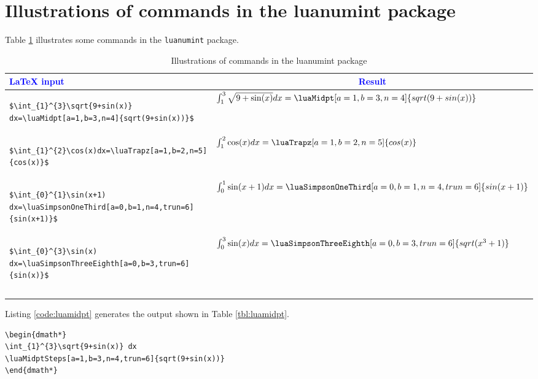 \documentclass{article}
\begin{document}
\section{Illustrations of commands in the luanumint package}
Table \ref{tbl:illluanumint} illustrates some commands in the \verb|luanumint| package.
\begin{center}
\begin{longtable}{m{10.8cm}l}
\toprule
\multicolumn{1}{l}{\textcolor{blue}{LaTeX input}} & \multicolumn{1}{c}{\textcolor{blue}{Result}}  \\
\toprule
\begin{lstlisting}[caption={[]}]
$\int_{1}^{3}\sqrt{9+sin(x)} dx=\luaMidpt[a=1,b=3,n=4]{sqrt(9+sin(x))}$
\end{lstlisting} & $\int_{1}^{3}\sqrt{9+\sin(x)} dx=\luaMidpt[a=1,b=3,n=4]{sqrt(9+sin(x))}$ \\  \midrule
\begin{lstlisting}[caption={[]}]
$\int_{1}^{2}\cos(x)dx=\luaTrapz[a=1,b=2,n=5]{cos(x)}$
\end{lstlisting} & $\int_{1}^{2}\cos(x) dx=\luaTrapz[a=1,b=2,n=5]{cos(x)}$ \\ \midrule
\begin{lstlisting}[caption={[]}]
$\int_{0}^{1}\sin(x+1) dx=\luaSimpsonOneThird[a=0,b=1,n=4,trun=6]{sin(x+1)}$
\end{lstlisting} & $\int_{0}^{1}\sin(x+1) dx=\luaSimpsonOneThird[a=0,b=1,n=4,trun=6]{sin(x+1)}$\\ \midrule
\begin{lstlisting}[caption={[]}]
$\int_{0}^{3}\sin(x) dx=\luaSimpsonThreeEighth[a=0,b=3,trun=6]{sin(x)}$
\end{lstlisting} & $\int_{0}^{3}\sin(x) dx=\luaSimpsonThreeEighth[a=0,b=3,trun=6]{sqrt(x^3+1)}$\\  \bottomrule \\
\caption{Illustrations of commands in the luanumint package}
\label{tbl:illluanumint}
\end{longtable}
\end{center}

Listing \ref{code:luamidpt} generates the output shown in Table \ref{tbl:luamidpt}.
\begin{lstlisting}[label={code:luamidpt}, caption={The luaMidptSteps command}]
\begin{dmath*}  
\int_{1}^{3}\sqrt{9+sin(x)} dx 
\luaMidptSteps[a=1,b=3,n=4,trun=6]{sqrt(9+sin(x))}
\end{dmath*}
\end{lstlisting}
\end{document}
